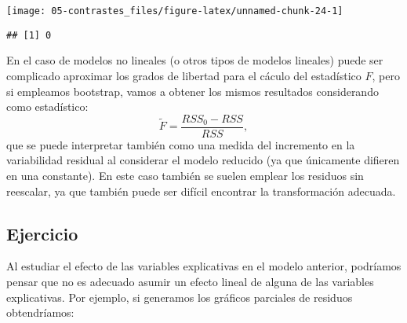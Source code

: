 \documentclass[
]{book}
\newenvironment{Shaded}{\begin{snugshade}}{\end{snugshade}}
\newcommand{\AttributeTok}[1]{\textcolor[rgb]{0.77,0.63,0.00}{#1}}
\newcommand{\ConstantTok}[1]{\textcolor[rgb]{0.00,0.00,0.00}{#1}}
\newcommand{\DecValTok}[1]{\textcolor[rgb]{0.00,0.00,0.81}{#1}}
\newcommand{\FunctionTok}[1]{\textcolor[rgb]{0.00,0.00,0.00}{#1}}
\newcommand{\NormalTok}[1]{#1}
\newcommand{\OtherTok}[1]{\textcolor[rgb]{0.56,0.35,0.01}{#1}}
\newcommand{\SpecialCharTok}[1]{\textcolor[rgb]{0.00,0.00,0.00}{#1}}
\newcommand{\StringTok}[1]{\textcolor[rgb]{0.31,0.60,0.02}{#1}}
\theoremstyle{break}
\theoremstyle{definition}
\theoremstyle{definition}
\theoremstyle{definition}
\theoremstyle{definition}
\theoremstyle{remark}
\begin{document}
\begin{Shaded}
\end{Shaded}

\begin{center}\texttt{[image: 05-contrastes\_files/figure-latex/unnamed-chunk-24-1]} \end{center}

\begin{Shaded}
\end{Shaded}

\begin{verbatim}
## [1] 0
\end{verbatim}

En el caso de modelos no lineales (o otros tipos de modelos lineales) puede ser
complicado aproximar los grados de libertad para el cáculo del estadístico \(F\),
pero si empleamos bootstrap, vamos a obtener los mismos resultados considerando
como estadístico:
\[\tilde F =\frac{RSS_0 - RSS}{RSS},\]
que se puede interpretar también como una medida del incremento en la variabilidad residual
al considerar el modelo reducido (ya que únicamente difieren en una constante).
En este caso también se suelen emplear los residuos sin reescalar, ya que también puede ser
difícil encontrar la transformación adecuada.

\hypertarget{ejercicio}{%
\subsection{Ejercicio}\label{ejercicio}}

Al estudiar el efecto de las variables explicativas en el modelo
anterior, podríamos pensar que no es adecuado asumir un efecto lineal
de alguna de las variables explicativas. Por ejemplo, si generamos los gráficos
parciales de residuos obtendríamos:
\end{document}
